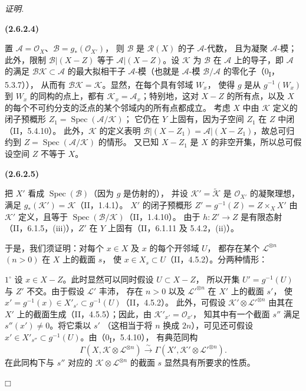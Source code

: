 \documentclass[UTF8,fontset=none,11pt,oneside,openany]{ctexbook}
\providecommand{\square}{\mdlgwhtsquare}
\newenvironment{env}[1][]{%
  \par\medskip\noindent\textbf{(#1)}\ %
}{\par}
\newenvironment{proof}{%
  \par\smallskip\noindent\textit{证明.}\ %
}{\hfill$\square$\par}
\let\EGAOriginalLabel\label
\renewcommand{\label}[1]{\phantomsection\EGAOriginalLabel{#1}}
\begin{document}
\begin{proof}
\begin{env}[2.6.2.4]
\label{III.2.6.2.4-fr}
置 $\mathcal A=\mathcal O_X$、$\mathcal B=g_*(\mathcal O_{X'})$，
则 $\mathcal B$ 是 $\mathcal R(X)$ 的子 $\mathcal A$-代数，
且为凝聚 $\mathcal A$-模；此外，限制 $\mathcal B|(X-Z)$ 等于
$\mathcal A|(X-Z)$。设 $\mathcal K$ 为 $\mathcal B$ 在 $\mathcal A$
上的导子，即 $\mathcal A$ 的满足 $\mathcal B\mathcal K\subset\mathcal A$
的最大拟相干子 $\mathcal A$-模（也就是 $\mathcal A$-模
$\mathcal B/\mathcal A$ 的零化子（0\textsubscript{I}，5.3.7）），
从而有 $\mathcal B\mathcal K=\mathcal K$。显然，在每个具有邻域 $W_x$，
使得 $g$ 是从 $g^{-1}(W_x)$ 到 $W_x$ 的同构的点上，都有
$\mathcal K_x=\mathcal A_x$；特别地，这对 $X-Z$ 的所有点，以及
$X$ 的每个不可约分支的泛点的某个邻域内的所有点都成立。
考虑 $X$ 中由 $\mathcal K$ 定义的闭子预概形
$Z_1=\operatorname{Spec}(\mathcal A/\mathcal K)$；
它仍在 $Y$ 上固有，因为子空间 $Z_1$ 在 $Z$ 中闭（II，5.4.10）。
此外，$\mathcal K$ 的定义表明
$\mathcal B|(X-Z_1)=\mathcal A|(X-Z_1)$，故总可归约到
$Z=\operatorname{Spec}(\mathcal A/\mathcal K)$ 的情形。
又已知 $X-Z_1$ 是 $X$ 的非空开集，所以总可假设空间 $Z$ 不等于 $X$。
\end{env}

\begin{env}[2.6.2.5]
\label{III.2.6.2.5-fr}
把 $X'$ 看成 $\operatorname{Spec}(\mathcal B)$（因为 $g$ 是仿射的），
并设 $\mathcal K'=\widetilde{\mathcal K}$ 是 $\mathcal O_{X'}$ 的凝聚理想，
满足 $g_*(\mathcal K')=\mathcal K$（II，1.4.1）。
$X'$ 的闭子预概形 $Z'=g^{-1}(Z)=Z\times_X X'$ 由 $\mathcal K'$
定义，且等于 $\operatorname{Spec}(\mathcal B/\mathcal K)$（II，1.4.10）。
由于 $h:Z'\to Z$ 是有限态射（II，6.1.5，(iii)），$Z'$ 在 $Y$
上固有（II，6.1.11 及 5.4.2，(ii)）。

于是，我们须证明：对每个 $x\in X$ 及 $x$ 的每个开邻域 $U$，
都存在某个 $\mathcal L^{\otimes n}$ $(n>0)$ 在 $X$ 上的截面 $s$，
使 $x\in X_s\subset U$（II，4.5.2）。分两种情形：

$1^\circ$ 设 $x\in X-Z$。此时显然可以同时假设 $U\subset X-Z$，
所以开集 $U'=g^{-1}(U)$ 与 $Z'$ 不交。由于假设 $\mathcal L'$ 丰沛，
存在 $n>0$ 以及 $\mathcal L'^{\otimes n}$ 在 $X'$ 上的截面 $s'$，
使 $x'=g^{-1}(x)\in X'_{s'}\subset g^{-1}(U)$（II，4.5.2）。
此外，可假设 $\mathcal K'\otimes\mathcal L'^{\otimes n}$ 由其在 $X'$
上的截面生成（II，4.5.5）；因此，由 $\mathcal K'_{x'}=\mathcal O_{x'}$，
知其中有一个截面 $s''$ 满足 $s''(x')\neq0$。将它乘以 $s'$
（这相当于将 $n$ 换成 $2n$），可见还可假设
$x'\in X'_{s''}\subset g^{-1}(U)$。由（0\textsubscript{I}，5.4.10），
有典范同构
\[
\Gamma(X,\mathcal K\otimes\mathcal L^{\otimes n})
\xrightarrow{\sim}
\Gamma(X',\mathcal K'\otimes\mathcal L'^{\otimes n}).
\]
在此同构下与 $s''$ 对应的 $\mathcal K\otimes\mathcal L^{\otimes n}$
的截面 $s$ 显然具有所要求的性质。


\end{env}
\end{proof}
\end{document}
